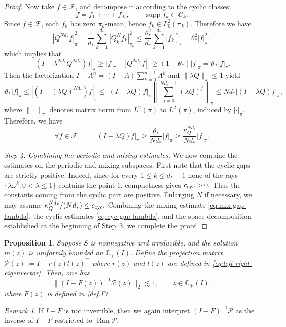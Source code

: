 \documentclass[11pt,twoside, a4paper]{article}
\numberwithin{equation}{section}
\numberwithin{figure}{section}
\theoremstyle{plain} %
\newtheorem{proposition}[theorem]{Proposition}
\theoremstyle{definition}
\theoremstyle{remark}
\newtheorem{remark}[theorem]{Remark}
\newcommand{\1} {\mspace{1 mu}}
\newcommand{\2} {\mspace{2 mu}}
\newcommand{\C} {{\mathbb{C}}}
\newcommand{\Cp} {\mathbb {C}_+}
\DeclareMathOperator{\supp}{supp}
\DeclareMathOperator{\Ran}{Ran}
\begin{document}
\begin{proof}
Now take \(f\in \mathcal F\), and decompose it according to the cyclic classes:
\[
f=f_1+\cdots+f_{d_*},
\qquad \supp f_k\subset \mathcal C_k.
\]
Since \(f\in\mathcal F\), each \(f_k\) has zero \(\pi_k\)-mean, hence \(f_k\in L_0^2(\pi_k)\). Therefore we have
\[
|Q^{Nd_*}f|_\pi^2
=
\frac1{d_*}\sum_{k=1}^{d_*}|Q_k^N f_k|_{\pi_k}^2
\le
\frac{\theta_*^2}{d_*}\sum_{k=1}^{d_*}|f_k|_{\pi_k}^2
=
\theta_*^2 |f|_\pi^2,
\]
which implies that 
\[
|(I-\lambda^{Nd_*}Q^{Nd_*})f|_\pi\ge |f|_\pi-|Q^{Nd_*}f|_\pi\ge (1-\theta_*)|f|_\pi
=\vartheta_*|f|_\pi.
\]
Then the factorization $I-A^n=(I-A)\sum_{k=0}^{n-1}A^k$ and $\|\lambda Q\|_\pi\le 1$ yield
\[
 \vartheta_*|f|_\pi\le|(I- (\lambda Q)^{Nd_*})f|_\pi
 \le
 |(I- \lambda Q)f|_\pi
 \left\|\sum_{j=0}^{Nd_*-1}(\lambda Q)^j\right\|_\pi
 \le Nd_*|(I- \lambda Q)f|_\pi,
\]
where $\|\cdot\|_\pi$ denotes matrix norm from $L^2(\pi)$ to $L^2(\pi)$, induced by $|\cdot|_\pi$.
Therefore, we have
\begin{equation}\label{eq:mix-gap-lambda}
\forall f\in \mathcal F,\qquad |(I-\lambda Q)f|_\pi \ge \frac{\vartheta_*}{Nd_*}|f|_\pi\ge \frac{\kappa_Q^{Nd_*}}{Nd_*}|f|_\pi .
\end{equation}


\medskip
\noindent\textit{Step 4: Combining the periodic and mixing estimates.}
We now combine the estimates on the periodic and mixing subspaces. First note
that the cyclic gaps are strictly positive. Indeed, since for every $1\le k\le d_*-1$ none of the rays \(\{\lambda\omega^k:0<\lambda\le 1\}\) contains the point \(1\), compactness gives
$
  c_{\rm cyc}>0.
$
Thus the constants coming from the cyclic part are positive. Enlarging \(N\)
if necessary, we may assume
$
  \kappa_Q^{Nd_*}/(N d_*)\le c_{\rm cyc}.
$
Combining the mixing estimate \eqref{eq:mix-gap-lambda}, the cyclic estimates
\eqref{eq:cyc-gap-lambda}, and the space
decomposition established at the beginning of Step~3, we complete the proof.

\end{proof}


\begin{proposition}\label{pro.I-F-second}
Suppose $S$ is nonnegative and irreducible, and the solution $m(z)$ is uniformly bounded on $\C_+(I)$. Define the projection matrix $\mathcal{P}(z):=I-r(z)l(z)^\top$ where $r(z)$ and $l(z)$ are defined in \eqref{eq:left-right-eigenvector}. Then, one has
\begin{equation}
  \big\|(I-F(z))^{-1}\mathcal{P}(z)\big\|_2\lesssim 1,\qquad z\in\overline{\Cp}(I).
\end{equation}
where \(F(z)\) is defined in \eqref{def.F}. 
\end{proposition}
\begin{remark}
  If $I-F$ is not invertible, then we again interpret \((I-F)^{-1}\mathcal{P}\) as the inverse of \(I-F\) restricted to \(\Ran \mathcal{P}\).
\end{remark}
\end{document}
